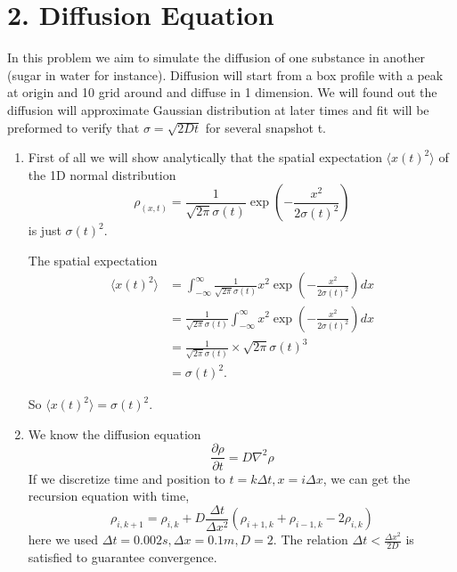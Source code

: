 \documentclass[aps,prl,preprint,superscriptaddress]{revtex4}
\begin{document}
	
	\section{2. Diffusion Equation}
	In this problem we aim to simulate the diffusion of one substance in another (sugar in water for instance). Diffusion will start from a box profile with a peak at origin and 10 grid around and diffuse in 1 dimension. We will found out the diffusion will approximate Gaussian distribution at later times and fit will be preformed to verify that $\sigma=\sqrt{2Dt}$ for several snapshot t.

\begin{enumerate}
\item First of all we will show analytically that the spatial expectation $\langle x(t)^2\rangle$ of the 1D normal distribution 
\begin{equation}
\rho_{(x,t)}=\frac{1}{\sqrt{2\pi}\sigma{(t)}}\exp(-\frac{x^2}{2\sigma{(t)}^2})
\end{equation}
is just $\sigma(t)^2$.

The spatial expectation
\begin{equation}
\begin{split}
\langle x(t)^2\rangle&=\int_{-\infty}^{\infty}\frac{1}{\sqrt{2\pi}\sigma(t)}x^2\exp(-\frac{x^2}{2\sigma(t)^2})dx\\
&=\frac{1}{\sqrt{2\pi}\sigma(t)}\int_{-\infty}^{\infty}x^2\exp(-\frac{x^2}{2\sigma(t)^2})dx\\
&=\frac{1}{\sqrt{2\pi}\sigma(t)}\times \sqrt{2\pi}\sigma(t)^3\\
&=\sigma(t)^2.
\end{split}
\end{equation}

So $\langle x(t)^2\rangle=\sigma(t)^2$.
\item We know the diffusion equation
\begin{equation}
\frac{\partial\rho}{\partial t}=D\nabla^2\rho
\end{equation}
If we discretize time and position to $t=k\Delta t, x=i\Delta x$, we can get the recursion equation with time, 
\begin{equation}
\rho_{i,k+1}=\rho_{i,k}+D\frac{\Delta t}{\Delta x^2}(\rho_{i+1,k}+\rho_{i-1,k}-2\rho_{i,k})
\end{equation}
here we used $\Delta t=0.002s, \Delta x=0.1m, D=2$. The relation $\Delta t<\frac{\Delta x^2}{2D}$ is satisfied to guarantee convergence.

\end{enumerate}
\end{document}
